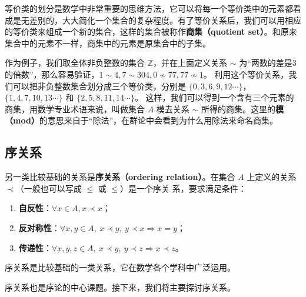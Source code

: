 等价类的划分是数学中非常重要的思维方法，它可以将每一个等价类中的元素都看成是无差别的，大大简化一个集合的复杂程度。有了等价关系后，我们可以用相应的等价类来组成一个新的集合，这样的集合被称作\textbf{商集（quotient set）}。和原来集合中的元素不一样，商集中的元素是原集合中的子集。

作为例子，我们取全体非负整数的集合 $\mathbb{Z}$，并在上面定义关系 $\sim$ 为“两数的差是3的倍数”，那么容易验证，$1\sim4, 7\sim304, 0\not\sim 77, 77\not\sim 1$。 利用这个等价关系，我们可以把非负整数集合划分成三个等价类，分别是 $\{0, 3, 6, 9, 12\cdots \}$，$\{1, 4, 7, 10, 13\cdots\}$ 和 $\{2, 5, 8, 11, 14\cdots\}$。 这样，我们可以得到一个含有三个元素的商集，用数学专业术语来说，叫做集合 $A$ 模去关系 $\sim$ 所得的商集。这里的\textbf{模（mod）}的意思来自于“除法”，在群论中会看到为什么用除法来命名商集。

\subsection{序关系}\label{sub_Relat_2}

另一类比较基础的关系是\textbf{序关系（ordering relation）}。在集合 $A$ 上定义的关系 $\prec$（一般也可以写成 $\leq$ 或 $\leqslant$）是一个序关
系，要求满足条件：
\begin{enumerate}
\item \textbf{自反性}：$\forall x\in A,x\prec x$；
\item \textbf{反对称性}：$\forall x,y\in A,\ x\prec y,\ y\prec x \Rightarrow x = y $；
\item \textbf{传递性}：$\forall x,y,z\in A,\ x\prec y,\ y\prec z \Rightarrow x\prec z $。
\end{enumerate}

序关系是比较基础的一类关系，它在数学各个学科中广泛运用。

序关系也是序论的中心课题。接下来，我们将主要探讨序关系。

